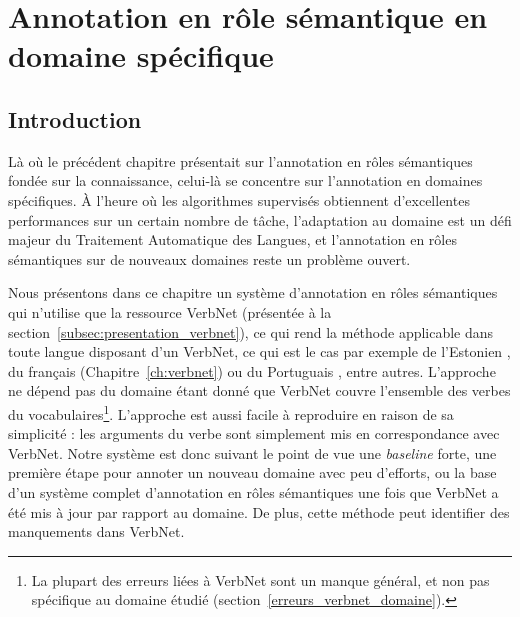 

\chapter{Annotation en rôle sémantique en domaine spécifique}
\label{ch:domainsrl}

\section{Introduction}

Là où le précédent chapitre présentait sur l'annotation en rôles sémantiques
fondée sur la connaissance, celui-là se concentre sur l'annotation en domaines
spécifiques. À l'heure où les algorithmes supervisés obtiennent d'excellentes
performances sur un certain nombre de tâche, l'adaptation au domaine est un
défi majeur du Traitement Automatique des Langues, et l'annotation en rôles
sémantiques sur de nouveaux domaines reste un problème ouvert. 

Nous présentons dans ce chapitre un système d'annotation en rôles sémantiques
qui n'utilise que la ressource VerbNet (présentée à la
section~\ref{subsec:presentation_verbnet}), ce qui rend la méthode applicable
dans toute langue disposant d'un VerbNet, ce qui est le cas par exemple de
l'Estonien \citep{jentson2014verbnet}, du français (Chapitre~\ref{ch:verbnet})
ou du Portuguais \citep{scarton2012towards}, entre autres. L'approche ne dépend
pas du domaine étant donné que VerbNet couvre l'ensemble des verbes du
vocabulaires\footnote{La plupart des erreurs liées à VerbNet sont un manque
général, et non pas spécifique au domaine étudié
(section~\ref{erreurs_verbnet_domaine}).}. L'approche est aussi facile à
reproduire en raison de sa simplicité : les arguments du verbe sont simplement
mis en correspondance avec VerbNet. Notre système est donc suivant le point de
vue une \emph{baseline} forte, une première étape pour annoter un nouveau
domaine avec peu d'efforts, ou la base d'un système complet d'annotation en
rôles sémantiques une fois que VerbNet a été mis à jour par rapport au domaine.
De plus, cette méthode peut identifier des manquements dans VerbNet.

